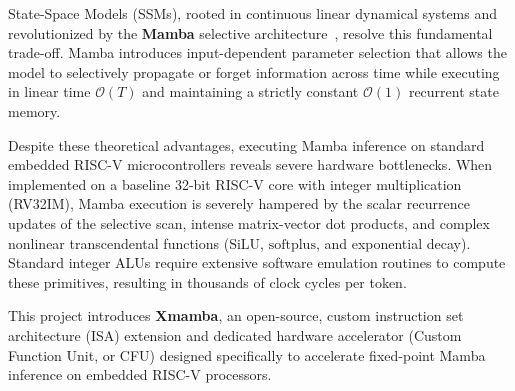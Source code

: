 \documentclass[11pt,a4paper,oneside]{report}
\begin{document}
State-Space Models (SSMs), rooted in continuous linear dynamical systems and revolutionized by the \textbf{Mamba} selective architecture~\cite{gu2023mamba}, resolve this fundamental trade-off. Mamba introduces input-dependent parameter selection that allows the model to selectively propagate or forget information across time while executing in linear time $\mathcal{O}(T)$ and maintaining a strictly constant $\mathcal{O}(1)$ recurrent state memory.

Despite these theoretical advantages, executing Mamba inference on standard embedded RISC-V microcontrollers reveals severe hardware bottlenecks. When implemented on a baseline 32-bit RISC-V core with integer multiplication (RV32IM), Mamba execution is severely hampered by the scalar recurrence updates of the selective scan, intense matrix-vector dot products, and complex nonlinear transcendental functions ($\text{SiLU}$, $\text{softplus}$, and exponential decay). Standard integer ALUs require extensive software emulation routines to compute these primitives, resulting in thousands of clock cycles per token.

This project introduces \textbf{Xmamba}, an open-source, custom instruction set architecture (ISA) extension and dedicated hardware accelerator (Custom Function Unit, or CFU) designed specifically to accelerate fixed-point Mamba inference on embedded RISC-V processors.
\end{document}
